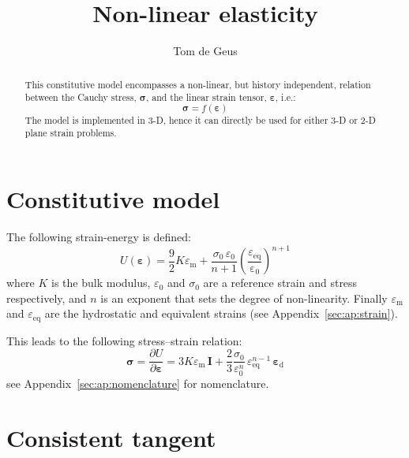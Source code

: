 \documentclass{goose-article}
\title{Non-linear elasticity}
\author[1]{Tom de Geus}
\begin{document}
\maketitle

\begin{abstract}
This constitutive model encompasses a non-linear, but history independent, relation between the Cauchy stress, $\bm{\sigma}$, and the linear strain tensor, $\bm{\varepsilon}$, i.e.:
\begin{equation*}
  \bm{\sigma} = f \left( \bm{\varepsilon} \right)
\end{equation*}
The model is implemented in 3-D, hence it can directly be used for either 3-D or 2-D plane strain problems.
\end{abstract}

\section{Constitutive model}

The following strain-energy is defined:
%
\begin{equation}
  U ( \bm{\varepsilon} )
  = \frac{9}{2} K \varepsilon_\mathrm{m}
  + \frac{ \sigma_0 \, \varepsilon_0 }{ n+1 }
    \left( \frac{\varepsilon_\mathrm{eq}}{\mathrm{\varepsilon_0}} \right)^{n+1}
\end{equation}
%
where $K$ is the bulk modulus, $\varepsilon_0$ and $\sigma_0$ are a reference strain and stress respectively, and $n$ is an exponent that sets the degree of non-linearity. Finally $\varepsilon_\mathrm{m}$ and $\varepsilon_\mathrm{eq}$ are the hydrostatic and equivalent strains (see Appendix~\ref{sec:ap:strain}).

This leads to the following stress--strain relation:
%
\begin{equation}
\label{eq:stress}
  \bm{\sigma}
  = \frac{\partial U}{\partial \bm{\varepsilon}}
  = 3 K \varepsilon_\mathrm{m} \, \bm{I}
  + \frac{2}{3} \frac{\sigma_0}{\varepsilon_0^n} \,
    \varepsilon_\mathrm{eq}^{n-1} \, \bm{\varepsilon}_\mathrm{d}
\end{equation}
%
see Appendix~\ref{sec:ap:nomenclature} for nomenclature.

\section{Consistent tangent}
\end{document}
